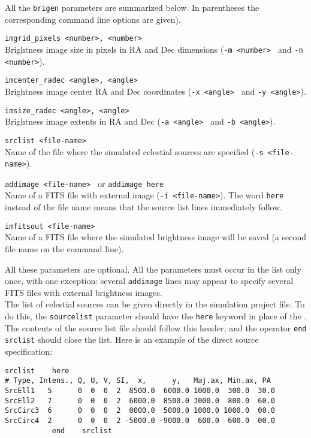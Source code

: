 \documentclass[letterpaper, oneside, 11pt]{article}
\begin{document}
All the {\tt brigen} parameters are summarized below. In parentheses the corresponding command line options are given).\\
\begin{description}
\item{\tt imgrid\_pixels \quad <number>, <number>} \\
Brightness image size in pixels in RA and Dec dimensions ({\tt -m <number> } and {\tt -n <number>}).
\item{\tt imcenter\_radec  <angle>, <angle> } \\
Brightness image center RA and Dec coordinates ({\tt -x <angle> } and {\tt -y <angle>}).
\item{\tt imsize\_radec  <angle>, <angle> } \\
Brightness image extents in RA and Dec ({\tt -a <angle> } and {\tt -b <angle>}).
\item{\tt srclist  <file-name> } \\
Name of the file where the simulated celestial sources are specified ({\tt -s <file-name>}).
\item{\tt addimage  <file-name> } or {\tt addimage  here} \\
Name of a FITS file with external image ({\tt -i <file-name>}). The word {\tt here} instead of the file name means that the source list lines immediately follow.   
\item{\tt imfitsout  <file-name> } \\
Name of a FITS file where the simulated brightness image will be saved (a second file name on the command line).
\end{description}

All these parameters are optional. All the parameters must occur in the list only once, with one exception: several {\tt addimage} lines may appear to specify several FITS files with external brightness images.\\

The list of celestial sources can be given directly in the simulation project file. To do this, the {\tt sourcelist} parameter should have the {\tt here} keyword in place of the {\tt <file-name>}. The contents of the source list file should follow this header, and the operator {\tt end \quad srclist} should close the list. Here is an example of the direct source specification:
\begin{verbatim}
srclist    here
# Type, Intens., Q, U, V, SI,  x,      y,   Maj.ax, Min.ax, PA
SrcEll1   5      0  0  0  2  8500.0  6000.0 1000.0  300.0  30.0
SrcEll2   7      0  0  0  2  6000.0  8500.0 3000.0  800.0  60.0
SrcCirc3  6      0  0  0  2  0000.0  5000.0 1000.0 1000.0  00.0
SrcCirc4  2      0  0  0  2 -5000.0 -9000.0  600.0  600.0  00.0
           end    srclist
\end{verbatim}
 
\end{document}
